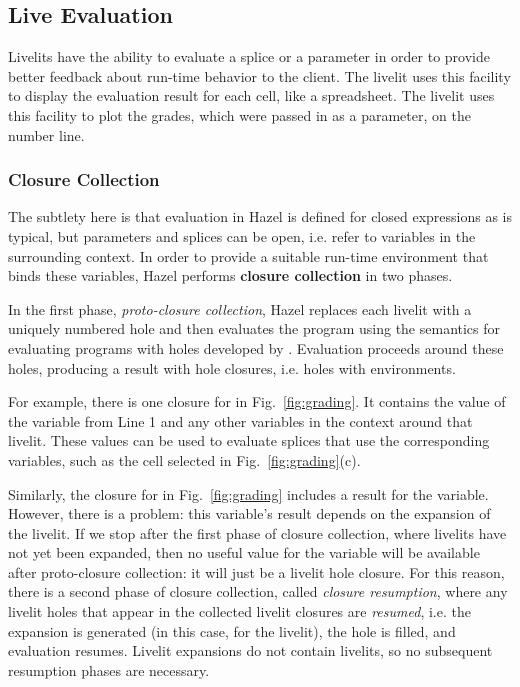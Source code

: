 \subsection{Live Evaluation}\label{sec:live-evaluation}
Livelits have the ability to evaluate a splice or a parameter 
in order to provide better feedback about run-time behavior to the client.
The  livelit uses this facility to display
the evaluation result for each cell, like a spreadsheet.
The  livelit uses this facility to plot the grades, which were 
passed in as a parameter, on the number line.

\subsubsection{Closure Collection} The subtlety here is that 
evaluation in Hazel is defined for closed expressions as is typical,
but parameters and splices can be open, i.e. refer to variables in the surrounding
context. In order to provide a suitable run-time environment that binds these variables, 
Hazel performs \textbf{closure collection} in two phases.

In the first phase, \emph{proto-closure collection}, 
Hazel replaces each livelit with a uniquely numbered hole and then evaluates the program 
using the semantics for evaluating programs with holes developed by \citet{HazelnutLive}.
Evaluation proceeds around these holes, producing a result with hole closures, i.e. holes with environments.

For example, there is one closure for  in Fig.~\ref{fig:grading}.
It contains the value of the  variable from Line 1 and any other variables in the context
around that livelit. 
These values can be used to evaluate 
splices that use the corresponding variables, such as the cell selected in Fig.~\ref{fig:grading}(c). 

Similarly, the closure for  in Fig.~\ref{fig:grading} includes a result for
the  variable. However, there is a problem: this variable's result depends on the
expansion of the  livelit. If we stop after the first phase of closure collection,
where livelits have not yet been expanded,
then no useful value for the  variable will be available after proto-closure collection:
it will just be a  livelit hole closure.
For this reason, there is a second phase of closure collection, called \emph{closure resumption}, 
where any livelit holes that appear
in the collected livelit closures are \emph{resumed}, i.e. the expansion is generated
(in this case, for the  livelit), the hole is filled, 
and evaluation resumes.
Livelit expansions do not contain livelits, so no subsequent resumption phases are necessary.

